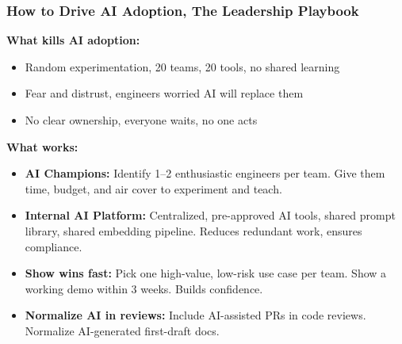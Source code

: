 \begin{frame}[fragile]\frametitle{How to Drive AI Adoption, The Leadership Playbook}
\textbf{What kills AI adoption:}
\begin{itemize}
\item Random experimentation, 20 teams, 20 tools, no shared learning
\item Fear and distrust, engineers worried AI will replace them
\item No clear ownership, everyone waits, no one acts
\end{itemize}

\textbf{What works:}
\begin{itemize}
\item \textbf{AI Champions:} Identify 1--2 enthusiastic engineers per team. Give them time, budget, and air cover to experiment and teach.
\item \textbf{Internal AI Platform:} Centralized, pre-approved AI tools, shared prompt library, shared embedding pipeline. Reduces redundant work, ensures compliance.
\item \textbf{Show wins fast:} Pick one high-value, low-risk use case per team. Show a working demo within 3 weeks. Builds confidence.
\item \textbf{Normalize AI in reviews:} Include AI-assisted PRs in code reviews. Normalize AI-generated first-draft docs.
\end{itemize}
\end{frame}

